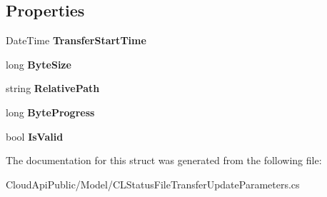 \subsection*{Properties}
\begin{DoxyCompactItemize}
\item 
\hypertarget{struct_cloud_api_public_1_1_model_1_1_c_l_status_file_transfer_update_parameters_a08835e909bd47601646169b6ea133033}{Date\-Time {\bfseries Transfer\-Start\-Time}}\label{struct_cloud_api_public_1_1_model_1_1_c_l_status_file_transfer_update_parameters_a08835e909bd47601646169b6ea133033}

\item 
\hypertarget{struct_cloud_api_public_1_1_model_1_1_c_l_status_file_transfer_update_parameters_a53b1bc6f6dc8ec69ab20a957168236e4}{long {\bfseries Byte\-Size}}\label{struct_cloud_api_public_1_1_model_1_1_c_l_status_file_transfer_update_parameters_a53b1bc6f6dc8ec69ab20a957168236e4}

\item 
\hypertarget{struct_cloud_api_public_1_1_model_1_1_c_l_status_file_transfer_update_parameters_ae9514d681f39c326ba2a8db63a44c59f}{string {\bfseries Relative\-Path}}\label{struct_cloud_api_public_1_1_model_1_1_c_l_status_file_transfer_update_parameters_ae9514d681f39c326ba2a8db63a44c59f}

\item 
\hypertarget{struct_cloud_api_public_1_1_model_1_1_c_l_status_file_transfer_update_parameters_a87be0ae56da1fc609e12bc933fd1ee60}{long {\bfseries Byte\-Progress}}\label{struct_cloud_api_public_1_1_model_1_1_c_l_status_file_transfer_update_parameters_a87be0ae56da1fc609e12bc933fd1ee60}

\item 
\hypertarget{struct_cloud_api_public_1_1_model_1_1_c_l_status_file_transfer_update_parameters_a83880ff890e3f162e656493eed095ed7}{bool {\bfseries Is\-Valid}}\label{struct_cloud_api_public_1_1_model_1_1_c_l_status_file_transfer_update_parameters_a83880ff890e3f162e656493eed095ed7}

\end{DoxyCompactItemize}


The documentation for this struct was generated from the following file\-:\begin{DoxyCompactItemize}
\item 
Cloud\-Api\-Public/\-Model/C\-L\-Status\-File\-Transfer\-Update\-Parameters.\-cs\end{DoxyCompactItemize}
